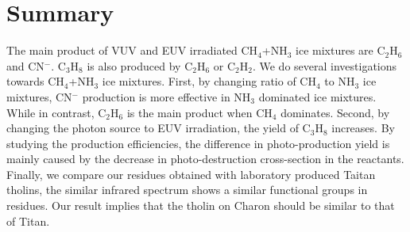 \section{Summary} %

The main product of VUV and EUV irradiated CH$_4$+NH$_3$ ice mixtures are C$_2$H$_6$ and CN$^-$. C$_3$H$_8$ is also produced by C$_2$H$_6$ or C$_2$H$_2$. We do several investigations towards CH$_4$+NH$_3$ ice mixtures. First, by changing ratio of CH$_4$ to NH$_3$ ice mixtures, CN$^-$ production is more effective in NH$_3$ dominated ice mixtures. While in contrast, C$_2$H$_6$ is the main product when CH$_4$ dominates. Second, by changing the photon source to EUV irradiation, the yield of C$_3$H$_8$ increases. By studying the production efficiencies, the difference in photo-production yield is mainly caused by the decrease in photo-destruction cross-section in the reactants. Finally, we compare our residues obtained with laboratory produced Taitan tholins, the similar infrared spectrum shows a similar functional groups in residues. Our result implies that the tholin on Charon should be similar to that of Titan.


